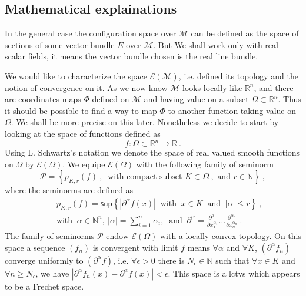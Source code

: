 \documentclass[12pt]{book}
\renewcommand{\sup}{\mathsf{sup}}
\newcommand{\abs}[1]{\left|#1\right|}
\newcommand{\Ecal}{\mathcal{E}}
\newcommand{\Mcal}{\mathcal{M}}
\newcommand{\Pcal}{\mathcal{P}}
\newcommand{\Nbb}{\mathbb{N}}
\newcommand{\Rbb}{\mathbb{R}}
\theoremstyle{break}
\begin{document}
\subsection{Mathematical explainations}


In the general case the configuration space over $\Mcal$ can be defined as the space of sections of some vector bundle $E$ over $\Mcal$. But We shall work only with real scalar fields, it means the vector bundle chosen is the real line bundle. 




We would like to characterize the space $\Ecal(\Mcal)$, i.e. defined its topology and the notion of convergence on it. As we now know $\Mcal$ looks locally like $\Rbb^n$, and there are coordinates maps $\Phi$ defined on $\Mcal$ and having value on a subset $\Omega \subset \Rbb^n$. Thus it should be possible to find a way to map $\Phi$ to another function taking value on $\Omega$. We shall be more precise on this later. Nonetheless we decide to start by looking at the space of functions defined as 
%
\begin{equation*}
f : \Omega \subset \Rbb^n \to \Rbb \ . 
\end{equation*}
%
Using L. Schwartz's notation we denote the space of real valued smooth functions on $\Omega$ by $\Ecal(\Omega)$\index{$\Ecal(\Omega)$}. We equipe $\Ecal(\Omega)$ with the following family of seminorm
%
\begin{equation*}
\Pcal = \left\{ p_{K,r}(f) \ , \ \mbox{ with compact subset } K \subset \Omega \ , \mbox{ and } r \in \Nbb \right\} \ ,
\end{equation*}
%
where the seminorms are defined as
%
\begin{eqnarray*}
&& p_{K,r}(f) = \sup \left\{ \abs{\partial^\alpha f(x)} \ \mbox{ with } \ x\in K \ \mbox{ and } \ \abs{\alpha} \leq r  \right\} \ , \\
&& \mbox{with } \ \alpha \in \Nbb^n, \ \abs{\alpha} = \sum_{i=1}^n \alpha_i, \ \mbox{ and } \ \partial^\alpha = \frac{\partial^{\alpha_1}}{\partial x_1^{\alpha_1}} \dots \frac{\partial^{\alpha_n}}{\partial x_n^{\alpha_n}} \ .
\end{eqnarray*}
%
The family of seminorms $\Pcal$ endow $\Ecal(\Omega)$ with a locally convex topology.  On this space a sequence $(f_n)$ is convergent with limit $f$ means $\forall \alpha$ and $\forall K$, $(\partial^\alpha f_n)$ converge uniformly to $(\partial^\alpha f)$, i.e. $\forall \epsilon > 0$ there is $N_\epsilon \in \Nbb$ such that $\forall x \in K$ and $\forall n \geq N_\epsilon$, we have $\abs{\partial^\alpha f_n(x) - \partial^\alpha f(x)} < \epsilon$. This space is a lctvs which appears to be a Frechet space.
\end{document}
